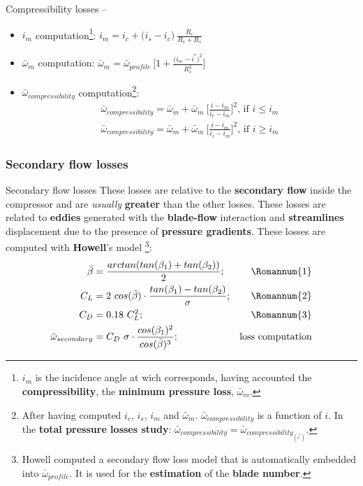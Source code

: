 	{\nologo
	\begin{frame}{Compressibility losses -- }
		\begin{itemize}
			\item $i_m$ computation\footnote{$i_m$ is the incidence angle at wich corresponds, having accounted the \textbf{compressibility}, the \textbf{minimum pressure loss}, $\bar{\omega}_m$.}: $i_m = i_c + \Big( i_s - i_c \Big) \ \frac{R_c}{R_c + R_s}$
			\item $\bar{\omega}_{m}$ computation: $\bar{\omega}_{m} = \bar{\omega}_{profile} \ \Bigg[ 1 + \frac{\big( i_m - i^{*} \big)^2}{R_s^{2}} \Bigg]$
			\item $\bar{\omega}_{compressibility}$ computation\footnote{After having computed $i_c$, $i_s$, $i_m$ and $\bar{\omega}_m$. $\bar{\omega}_{compressibility}$ is a function of $i$. In the \textbf{total pressure losses study}: $\bar{\omega}_{compressibility} = \bar{\omega}_{compressibility_{(i^*)}}$.}: 
				\begin{align}
					\bar{\omega}_{compressibility} = \bar{\omega}_m + \bar{\omega}_m \ \Bigg[ \frac{i - i_m}{i_c - i_m} \Bigg]^2 \text{, if } i \leq i_m\nonumber \\ 
					\bar{\omega}_{compressibility} = \bar{\omega}_m + \bar{\omega}_m \ \Bigg[ \frac{i - i_m}{i_s - i_m} \Bigg]^2 \text{, if } i \geq i_m \nonumber 
				\end{align}
		\end{itemize}
	\end{frame}
	}

\subsubsection{Secondary flow losses}
	\begin{frame}{Secondary flow losses}
		These losses are relative to the \textbf{secondary flow} inside the compressor and are \textit{usually} \textbf{greater} than the other losses. These losses are related to \textbf{eddies} generated with the \textbf{blade-flow} interaction and \textbf{streamlines} displacement due to the presence of \textbf{pressure gradients}. 
		\newline 
		These losses are computed with \textbf{Howell}'s model \cite[Ch. 6]{axial2004}\footnote{Howell computed a secondary flow loss model that is automatically embedded into $\bar{\omega}_{profile}$. It is used for the \textbf{estimation} of the \textbf{blade number}.}:
		\begin{align}
			\bar{\beta} & = \frac{arctan( tan( \beta_1 ) + tan( \beta_2 ) )}{2}; & \text{\Romannum{1}} \nonumber \\ 
			C_{L} & = 2 \ cos( \bar{\beta} ) \cdot \frac{tan( \beta_1 ) - tan( \beta_2 )}{\sigma}; & \text{\Romannum{2}} \nonumber \\
			C_{D} & = 0.18 \ C_{L}^2; & \text{\Romannum{3}} \nonumber \\
			\bar{\omega}_{secondary} & = C_{D} \ \sigma \cdot \frac{cos( \beta_1 )^2}{cos( \bar{\beta} )^3}; & \text{loss computation} \nonumber 
		\end{align}
	\end{frame}

